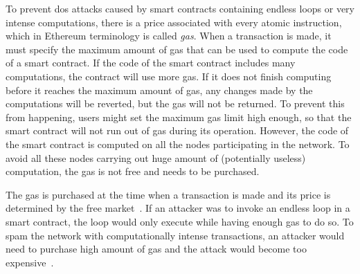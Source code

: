To prevent \acrfull{dos} attacks caused by smart contracts containing endless loops or very intense computations, there is a price associated with every atomic instruction, which in Ethereum terminology is called \textit{gas}. When a transaction is made, it must specify the maximum amount of gas that can be used to compute the code of a smart contract. If the code of the smart contract includes many computations, the contract will use more gas. If it does not finish computing before it reaches the maximum amount of gas, any changes made by the computations will be reverted, but the gas will not be returned. To prevent this from happening, users might set the maximum gas limit high enough, so that the smart contract will not run out of gas during its operation. However, the code of the smart contract is computed on all the nodes participating in the network. To avoid all these nodes carrying out huge amount of (potentially useless) computation, the gas is not free and needs to be purchased\footnotemark. 
% 

The gas is purchased at the time when a transaction is made and its price is determined by the free market~\cite{EthereumCommunityEthereumDocumentation}. If an attacker was to invoke an endless loop in a smart contract, the loop would only execute while having enough gas to do so. To spam the network with computationally intense transactions, an attacker would need to purchase high amount of gas and the attack would become too expensive~\cite[p.5]{Atzei2017ASoK}.

